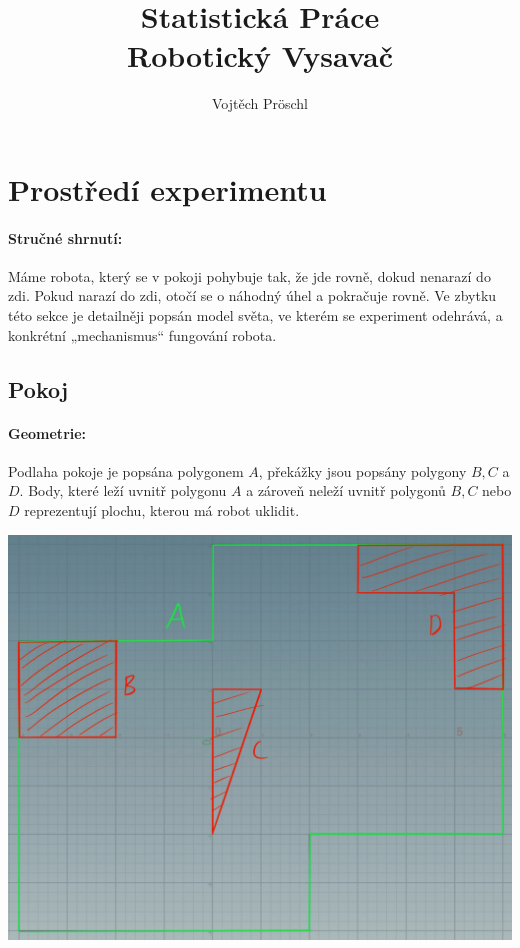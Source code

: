 \documentclass[11pt]{article}
\author{Vojtěch Pröschl}
\title{Statistická Práce \\ \large Robotický Vysavač}
\begin{document}
\maketitle


\section{Prostředí experimentu}
\paragraph{Stručné shrnutí:} Máme robota, který se v pokoji pohybuje tak, že jde rovně, dokud nenarazí do zdi. Pokud narazí do zdi, otočí se o náhodný úhel a pokračuje rovně. Ve zbytku této sekce je detailněji popsán model světa, ve kterém se experiment odehrává, a konkrétní „mechanismus“ fungování robota.

\subsection{Pokoj}
\paragraph{Geometrie:} Podlaha pokoje je popsána polygonem $A$, překážky jsou popsány polygony $B,C$ a $D$. Body, které leží uvnitř polygonu $A$ a zároveň neleží uvnitř polygonů $B,C$ nebo $D$ reprezentují plochu, kterou má robot uklidit.

\begin{center}
	\includegraphics[scale=0.27]{Images/RoomGeometry.jpeg}
\end{center}
\end{document}
